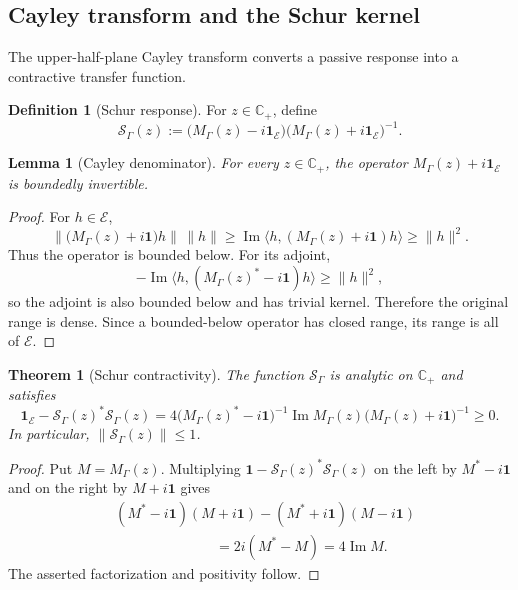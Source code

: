 \documentclass[11pt,reqno]{scrartcl}
\newcommand{\idop}{\mathbf 1}
\newcommand{\inner}[2]{\langle #1,#2\rangle}
\newcommand{\scrE}{\mathscr E}
\newcommand{\Mresp}{M_{\Gamma}}
\newcommand{\Sresp}{\mathscr S_{\Gamma}}
\newcommand{\Cplus}{\mathbb C_{+}}
\theoremstyle{plain}
\newtheorem{theorem}{Theorem}[section]
\newtheorem{lemma}[lemma]{Lemma}
\theoremstyle{definition}
\newtheorem{definition}[definition]{Definition}
\theoremstyle{remark}
\begin{document}
\subsection{Cayley transform and the Schur kernel}

The upper-half-plane Cayley transform converts a passive response into a
contractive transfer function.

\begin{definition}[Schur response]
\label{def:Schur-response}
For \(z\in\Cplus\), define
\begin{equation}
  \boxed{
  \Sresp(z)
  :=\bigl(\Mresp(z)-i\idop_{\scrE}\bigr)
    \bigl(\Mresp(z)+i\idop_{\scrE}\bigr)^{-1}.}
  \label{eq:Schur-response}
\end{equation}
\end{definition}

\begin{lemma}[Cayley denominator]
\label{lem:Cayley-denominator}
For every \(z\in\Cplus\), the operator
\(\Mresp(z)+i\idop_{\scrE}\) is boundedly invertible.
\end{lemma}

\begin{proof}
For \(h\in\scrE\),
\begin{equation}
  \|\bigl(\Mresp(z)+i\idop\bigr)h\|\,\|h\|
  \geq
  \operatorname{Im}\inner{h}{(\Mresp(z)+i\idop)h}
  \geq\|h\|^2.
\end{equation}
Thus the operator is bounded below.  For its adjoint,
\begin{equation}
  -\operatorname{Im}\inner{h}{(\Mresp(z)^*-i\idop)h}
  \ge \|h\|^2,
\end{equation}
so the adjoint is also bounded below and has trivial kernel.  Therefore the
original range is dense.  Since a bounded-below operator has closed range,
its range is all of \(\scrE\).
\end{proof}

\begin{theorem}[Schur contractivity]
\label{thm:Schur-contractivity}
The function \(\Sresp\) is analytic on \(\Cplus\) and satisfies
\begin{equation}
  \boxed{
  \idop_{\scrE}-\Sresp(z)^*\Sresp(z)
  =4\bigl(\Mresp(z)^*-i\idop\bigr)^{-1}
  \operatorname{Im}\Mresp(z)
  \bigl(\Mresp(z)+i\idop\bigr)^{-1}
  \geq0.}
  \label{eq:Schur-contractive-identity}
\end{equation}
In particular, \(\|\Sresp(z)\|\leq1\).
\end{theorem}

\begin{proof}
Put \(M=\Mresp(z)\).  Multiplying
\(\idop-\Sresp(z)^*\Sresp(z)\) on the left by \(M^*-i\idop\) and on the
right by \(M+i\idop\) gives
\begin{align}
  &(M^*-i\idop)(M+i\idop)
   -(M^*+i\idop)(M-i\idop)\\
  &\hspace{3cm}=2i(M^*-M)=4\operatorname{Im}M.
\end{align}
The asserted factorization and positivity follow.
\end{proof}
\end{document}
